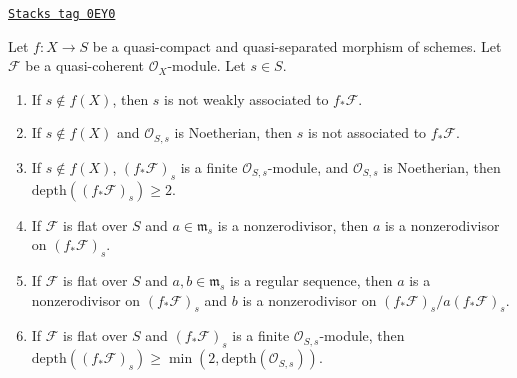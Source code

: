 \begin{lemma}
\label{divisors-lemma-depth-pushforward}
\href{https://stacks.math.columbia.edu/tag/0EY0}{\texttt{Stacks tag 0EY0}}

Let $f : X \to S$ be a quasi-compact and quasi-separated morphism of schemes.
Let $\mathcal{F}$ be a quasi-coherent $\mathcal{O}_X$-module.
Let $s \in S$.
\begin{enumerate}
\item If $s \not \in f(X)$, then $s$ is not weakly associated
to $f_*\mathcal{F}$.
\item If $s \not \in f(X)$ and $\mathcal{O}_{S, s}$ is Noetherian,
then $s$ is not associated to $f_*\mathcal{F}$.
\item If $s \not \in f(X)$, $(f_*\mathcal{F})_s$ is a finite
$\mathcal{O}_{S, s}$-module, and $\mathcal{O}_{S, s}$
is Noetherian, then $\text{depth}((f_*\mathcal{F})_s) \geq 2$.
\item If $\mathcal{F}$ is flat over $S$ and $a \in \mathfrak m_s$
is a nonzerodivisor, then $a$ is a nonzerodivisor on $(f_*\mathcal{F})_s$.
\item If $\mathcal{F}$ is flat over $S$ and $a, b \in \mathfrak m_s$
is a regular sequence, then $a$ is a nonzerodivisor on $(f_*\mathcal{F})_s$
and $b$ is a nonzerodivisor on $(f_*\mathcal{F})_s/a(f_*\mathcal{F})_s$.
\item If $\mathcal{F}$ is flat over $S$ and $(f_*\mathcal{F})_s$
is a finite $\mathcal{O}_{S, s}$-module, then
$\text{depth}((f_*\mathcal{F})_s) \geq
\min(2, \text{depth}(\mathcal{O}_{S, s}))$.
\end{enumerate}
\end{lemma}

